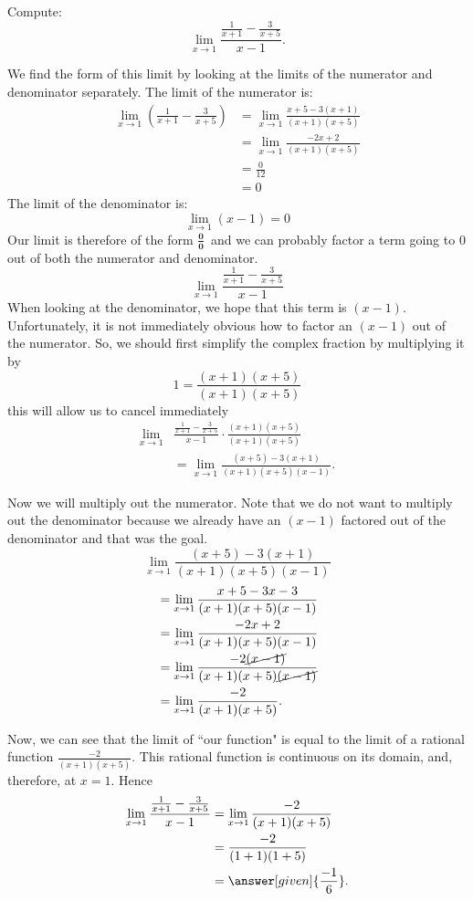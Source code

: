 \documentclass{ximera}
\begin{document}
\begin{example}
  Compute:
  \[
  \lim_{x\to 1} \frac{\frac{1}{x+1}-\frac{3}{x+5}}{x-1}.
  \]
\begin{explanation}
  We find the form of this limit by looking at the limits of the
  numerator and denominator separately. The limit of the numerator is:
  \begin{align*}
    \lim_{x\to 1}\left(\frac{1}{x+1}-\frac{3}{x+5}\right)&=  \lim_{x\to 1}\frac{x+5-3(x+1)}{(x+1)(x+5)}\\
    &= \lim_{x\to 1}\frac{-2x+2}{(x+1)(x+5)}\\
    &= \frac{0}{12}\\
    &=0
  \end{align*}
  The limit of the denominator is:
  \[
  \lim_{x\to 1}\left(x-1\right)=0
  \]
  Our limit is therefore of the form $\boldsymbol{\tfrac{0}{0}}$\ and we can
  probably factor a term going to $0$ out of both the numerator and
  denominator.
  \[
  \lim_{x\to 1} \frac{\frac{1}{x+1}-\frac{3}{x+5}}{x-1}
  \]
  When looking at the denominator, we hope that this
  term is $(x-1)$.  Unfortunately, it is not immediately obvious how to
  factor an $(x-1)$ out of the numerator. So, we should first simplify the complex fraction
  by multiplying it by
  \[
  1 = \frac{(x+1)(x+5)}{(x+1)(x+5)}
  \]
  this will allow us to cancel immediately
\begin{align*}
  \lim_{x\to 1}& \frac{\frac{1}{x+1}-\frac{3}{x+5}}{x-1}  \cdot \frac{(x+1)(x+5)}{(x+1)(x+5)} \\
  &= \lim_{x\to 1}\frac{(x+5)-3(x+1)}{(x+1)(x+5)(x-1)}.
\end{align*}

Now we will multiply out the numerator.  Note that we do not want to
multiply out the denominator because we already have an $(x-1)$
factored out of the denominator and that was the goal.
\[
\lim_{x\to 1}\frac{(x+5)-3(x+1)}{(x+1)(x+5)(x-1)}
\]
\begin{align*}
  &= \lim_{x\to 1}\frac{x+5-3x-3}{(x+1)(x+5)(x-1)} \\
  &= \lim_{x\to 1}\frac{-2x+2}{(x+1)(x+5)(x-1)}\\
  &= \lim_{x\to 1}\frac{-2\cancel{(x-1)}}{(x+1)(x+5)\cancel{(x-1)}}\\
  &= \lim_{x\to 1}\frac{-2}{(x+1)(x+5)}.
\end{align*}

Now, we can see that the limit of ``our function" is equal to the limit of a rational function $\frac{-2}{(x+1)(x+5)}$. This rational function is continuous on its domain, and, therefore, at $x=1$.  Hence
\begin{align*}
\lim_{x\to 1} \frac{\frac{1}{x+1}-\frac{3}{x+5}}{x-1}&=\lim_{x\to
  1}\frac{-2}{(x+1)(x+5)}\\
&= \frac{-2}{(1+1)(1+5)} \\
&=\answer[given]{\frac{-1}{6}}.
\end{align*}
\end{explanation}
\end{example}
\end{document}
